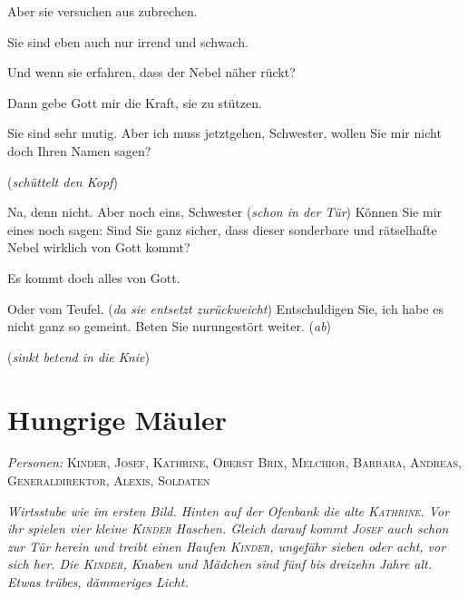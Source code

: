 \documentclass[
	final,
	a4paper,
	ngerman,
	mpinclude = true, %
	twoside = true,
	open = right,
	cleardoublepage = plain,
	DIV = 13,
	BCOR = 1cm,
	titlepage = firstiscover,
	]{scrbook}
\newcommand{\scene}{\setcounter{subscene}{1}\section}
\newcommand{\direction}[1]{(\textit{#1})}
\newcommand{\setting}[1]{\vspace{-0.5\baselineskip}\centering\textit{#1}}
\newcounter{subscene}
\newcommand{\characterlist}[1]{{\begin{center}\textit{Personen:}\quad{}#1\end{center}}}
\newcommand{\thecharacter}[1]{\textup{\textsc{#1}}\xspace}
\newcommand{\theBarbara}{\thecharacter{Barbara}}
\newcommand{\theJosef}{\thecharacter{Josef}}
\newcommand{\theKathrine}{\thecharacter{Kathrine}}
\newcommand{\theAndreas}{\thecharacter{Andreas}}
\newcommand{\theGeneraldirektor}{\thecharacter{Generaldirektor}}
\newcommand{\theAlexis}{\thecharacter{Alexis}}
\newcommand{\theSalwin}{\thecharacter{Salwin}}
\newcommand{\theBrix}{\thecharacter{Oberst Brix}}
\newcommand{\theMelchior}{\thecharacter{Melchior}}
\newcommand{\theKinder}{\thecharacter{Kinder}}
\newcommand{\theSoldaten}{\thecharacter{Soldaten}}
\newcommand{\character}[1]{\item[#1]}
\newcommand{\Salwin}{\character{\theSalwin}}
\newcommand{\Heilsarmeeschwester}{\character{Schwester}}
\begin{document}
\begin{play}
\Salwin
Aber sie versuchen aus zubrechen.

\Heilsarmeeschwester
Sie sind eben auch nur irrend und schwach.

\Salwin
Und wenn sie erfahren, dass der Nebel näher rückt?

\Heilsarmeeschwester
Dann gebe Gott mir die Kraft, sie zu stützen.

\Salwin
Sie sind sehr mutig. Aber ich muss jetztgehen, Schwester, wollen Sie mir nicht doch Ihren Namen sagen?

\Heilsarmeeschwester
\direction{schüttelt den Kopf}

\Salwin
Na, denn nicht. Aber noch eins, Schwester \direction{schon in der Tür} Können Sie mir eines noch sagen: Sind Sie ganz sicher, dass dieser sonderbare und rätselhafte Nebel wirklich von Gott kommt?

\Heilsarmeeschwester
Es kommt doch alles von Gott.

\Salwin
Oder vom Teufel. \direction{da sie entsetzt zurückweicht} Entschuldigen Sie, ich habe es nicht ganz so gemeint. Beten Sie nurungestört weiter. \direction{ab}

\Heilsarmeeschwester
\direction{sinkt betend in die Knie}

\end{play}



\scene{Hungrige Mäuler}
\label{scene:IV}
\characterlist{
	\theKinder,
	\theJosef,
	\theKathrine,
	\theBrix,
	\theMelchior,
	\theBarbara,
	\theAndreas,
	\theGeneraldirektor,
	\theAlexis,
	\theSoldaten
}
\setting{Wirtsstube wie im ersten Bild. Hinten auf der Ofenbank die alte \theKathrine. Vor ihr spielen vier kleine \theKinder Haschen. Gleich darauf kommt \theJosef auch schon zur Tür herein und treibt einen Haufen \theKinder, ungefähr sieben oder acht, vor sich her. Die \theKinder, Knaben und Mädchen sind fünf bis dreizehn Jahre alt. Etwas trübes, dämmeriges Licht.}
\end{document}
